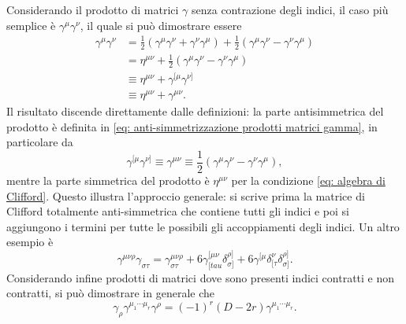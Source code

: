 Considerando il prodotto di matrici $\gamma$ senza contrazione degli indici, il caso più semplice è $\gamma^\mu\gamma^\nu$, il quale si può dimostrare essere 
\begin{equation}
    \begin{split}
        \gamma^\mu\gamma^\nu &= \frac{1}{2}(\gamma^\mu\gamma^\nu + \gamma^\nu\gamma^\mu) + \frac{1}{2}(\gamma^\mu\gamma^\nu - \gamma^\nu\gamma^\mu) \\
        &= \eta^{\mu\nu} + \frac{1}{2}(\gamma^\mu\gamma^\nu - \gamma^\nu\gamma^\mu) \\
        &\equiv \eta^{\mu\nu} + \gamma^{[\mu}\gamma^{\nu]} \\
        &\equiv \eta^{\mu\nu} + \gamma^{\mu\nu}.
    \end{split}
\end{equation}
Il risultato discende direttamente dalle definizioni: la parte antisimmetrica del prodotto è definita in \eqref{eq: anti-simmetrizzazione prodotti matrici gamma}, in particolare da 
\begin{equation}
    \gamma^{[\mu}\gamma^{\nu]} \equiv \gamma^{\mu\nu} \equiv \frac{1}{2}(\gamma^\mu\gamma^\nu - \gamma^\nu\gamma^\mu),
\end{equation}
mentre la parte simmetrica del prodotto è $\eta^{\mu\nu}$ per la condizione \eqref{eq: algebra di Clifford}. Questo illustra l'approccio generale: si scrive prima la matrice di Clifford totalmente anti-simmetrica che contiene tutti gli indici e poi si aggiungono i termini per tutte le possibili gli accoppiamenti degli indici. Un altro esempio è
\begin{equation}
    \gamma^{\mu\nu\rho}\gamma_{\sigma\tau} = \gamma^{\mu\nu\rho}_{\sigma\tau} + 6\gamma^{[\mu\nu}_{[tau}\delta^{\rho]}_{\sigma]} + 6\gamma^{[\mu}\delta^{\nu}_{[\tau}\delta^{\rho]}_{\sigma]}.
\end{equation}
Considerando infine prodotti di matrici dove sono presenti indici contratti e non contratti, si può dimostrare in generale che 
\begin{equation}
    \gamma_\rho\gamma^{\mu_1\cdots\mu_r}\gamma^\rho = (-1)^r(D - 2r)\gamma^{\mu_1\cdots\mu_r}.
\end{equation}

